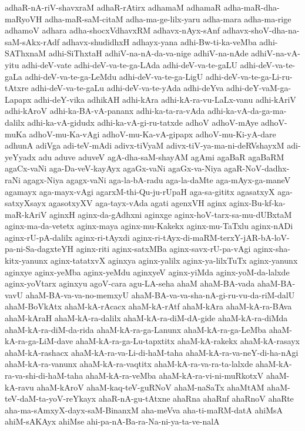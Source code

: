 {adhaR-nA-riV-shavxraM
adhaR-rAtirx
adhamaM
adhamaR
adha-maR-dha-maRyoVH
adha-maR-saM-citaM
adha-ma-ge-lilx-yaru
adha-mara
adha-ma-rige
adhamoV
adhara
adha-shocxVdhavxRM
adhavx-nAyx-sAnf
adhavx-shoV-dha-na-saM-sAkx-rAdf
adhavx-shudidhxH
adhayx-yana
adhi-Bw-ti-ka-veMba
adhi-SAThxnaM
adhi-SiThxtaH
adhiV-na-nA-da-va-nige
adhiV-na-nAde
adhiV-na-vA-yitu
adhi-deV-vate
adhi-deV-va-te-ga-LAda
adhi-deV-va-te-gaLU
adhi-deV-va-te-gaLa
adhi-deV-va-te-ga-LeMdu
adhi-deV-va-te-ga-LigU
adhi-deV-va-te-ga-Li-ru-tAtxre
adhi-deV-va-te-gaLu
adhi-deV-va-te-yAda
adhi-deYva
adhi-deY-vaM-ga-Lapapx
adhi-deY-vika
adhikAH
adhi-kAra
adhi-kA-ra-vu-LaLx-vanu
adhi-kAriV
adhi-kAroV
adhi-ka-BA-vA-pananx
adhi-ka-ta-ra-vAda
adhi-ka-vA-da-ga-ma-dalilx
adhi-ka-vA-gidudx
adhi-ka-vA-gi-ru-tatxde
adhoV
adhoV-mAye
adhoV-muKa
adhoV-mu-Ka-vAgi
adhoV-mu-Ka-vA-gipapx
adhoV-mu-Ki-yA-dare
adhunA
adiVga
adi-teV-mAdi
adivx-tiVyaM
adivx-tiV-ya-ma-ni-deRVshayxM
adi-yeYyadx
adu
aduve
aduveV
agA-dha-saM-shayAM
agAmi
agaBaR
agaBaRM
agaCx-vaNi
aga-Da-veV-kayAyx
agaGx-vaNi
agaGx-va-Niya
agaR-NoV-dadhx-raNi
agagx-Niya
agagx-vaNi
aga-la-bA-radu
aga-la-daMte
aga-mAyx-ga-maneV
agamayx
aga-mayx-vAgi
agarxM-thi-Qu-ju-rUpaH
aga-sa-gititx
agasatxyX
aga-satxyXsayx
agasotxyXV
aga-tayx-vAda
agati
agenxVH
aginx
aginx-Bu-kf-ka-maR-kAriV
aginxH
aginx-da-gAdhxni
aginxge
aginx-hoV-tarx-sa-mu-dUBxtaM
aginx-ma-da-vetetx
aginx-maya
aginx-mu-Kakekx
aginx-mu-TaTxlu
aginx-nADi
aginx-rU-pA-dalilx
aginx-ri-tAyxdi
aginx-ri-tAyx-di-maRM-terxY-jAR-bA-loV-pa-ni-Sa-dagxteYH
aginx-riti
aginx-satxMBa
aginx-savx-rU-pa-vAgi
aginx-sha-kitx-yanunx
aginx-tatatxvX
aginxya
aginx-yalilx
aginx-ya-lilxTuTx
aginx-yanunx
aginxye
aginx-yeMba
aginx-yeMdu
aginxyeV
aginx-yiMda
aginx-yoM-da-lalxde
aginx-yoVtarx
aginxyu
agoV-cara
agu-LA-seha
ahaM
ahaM-BA-vada
ahaM-BA-vavU
ahaM-BA-va-va-no-memxyU
ahaM-BA-va-va-sha-nA-gi-ru-vu-da-riM-dalU
ahaM-BoVkAtx
ahaM-kA-rAcacx
ahaM-kA-rAtf
ahaM-kAra
ahaM-kA-ra-BAva
ahaM-kAraH
ahaM-kA-ra-dalilx
ahaM-kA-ra-diM-dA-gide
ahaM-kA-ra-diMda
ahaM-kA-ra-diM-da-rida
ahaM-kA-ra-ga-Lanunx
ahaM-kA-ra-ga-LeMba
ahaM-kA-ra-ga-LiM-dave
ahaM-kA-ra-ga-Lu-tapxtitx
ahaM-kA-rakekx
ahaM-kA-rasayx
ahaM-kA-rashacx
ahaM-kA-ra-va-Li-di-haM-taha
ahaM-kA-ra-va-neY-di-ha-nAgi
ahaM-kA-ra-vanunx
ahaM-kA-ra-vaqtitx
ahaM-kA-ra-va-ra-ta-lalxde
ahaM-kA-ra-va-shi-di-haM-taha
ahaM-kA-ra-veMba
ahaM-kA-ra-vi-ni-muRkotxV
ahaM-kA-ravu
ahaM-kAroV
ahaM-kaq-teV-guRNoV
ahaM-naSaTx
ahaMtAM
ahaM-teV-daM-ta-yoV-reYkayx
ahaR-nA-gu-tAtxne
ahaRna
ahaRnf
ahaRnoV
ahaRte
aha-ma-sAmxyX-dayx-saM-BinanxM
aha-meVva
aha-ti-maRM-datA
ahiMsA
ahiM-sAKAyx
ahiMse
ahi-pa-nA-Ba-ra-Na-ni-ya-ta-ve-nalA
}
